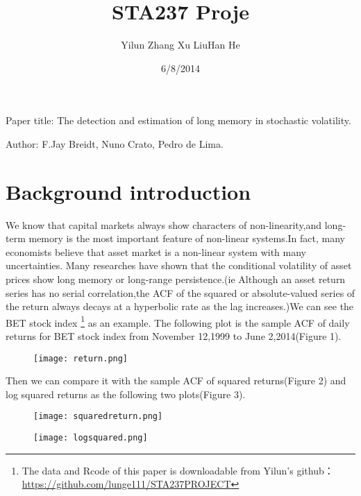 \documentclass[10pt,a4paper]{article}
\title{\huge STA237 Proje}
\date{6/8/2014}
\author[1]{Yilun Zhang \qquad  Xu Liu\qquad Han He}
\begin{document}
\maketitle
\begin{center} Paper title: The detection and estimation of long memory in stochastic volatility.\end{center}

\begin{center} Author: F.Jay Breidt, Nuno Crato, Pedro de Lima.\end{center}

\section{Background introduction}

We know that capital markets always show characters of non-linearity,and long-term memory is the most important feature of non-linear systems.In fact, many economists believe that asset market is a non-linear system with many uncertainties. Many researches have shown that the conditional volatility of asset prices show long memory or long-range persistence.(ie Although an asset return series has no serial correlation,the ACF of the squared or absolute-valued series of the return always decays at a hyperbolic rate as the lag increases.)We can see the BET stock index  \footnote[1]{The data and Rcode of this paper is downloadable from Yilun's github： \url{https://github.com/lunge111/STA237PROJECT}} as an example. The following plot is the sample ACF of daily returns for BET stock index from November 12,1999 to June 2,2014(Figure 1).

\begin{figure}[!htb]
\centering
\texttt{[image: return.png]}
\caption{}
\end{figure}

Then we can compare it with the sample ACF of squared returns(Figure 2) and log squared returns as the following two plots(Figure 3).

\begin{figure}[!htb]
\centering
\texttt{[image: squaredreturn.png]}
\caption{}
\end{figure}

\begin{figure}[!htb]
\centering
\texttt{[image: logsquared.png]}
\caption{}
\end{figure}
\end{document}
